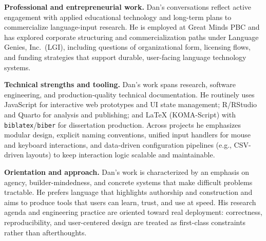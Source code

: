 \UTCOneSingleBlank

\textbf{Professional and entrepreneurial work.}
Dan’s conversations reflect active engagement with applied educational technology and long-term plans to commercialize language-input research. He is employed at Great Minds PBC and has explored corporate structuring and commercialization paths under Language Genies, Inc.\ (LGI), including questions of organizational form, licensing flows, and funding strategies that support durable, user-facing language technology systems.

\UTCOneSingleBlank

\textbf{Technical strengths and tooling.}
Dan’s work spans research, software engineering, and production-quality technical documentation. He routinely uses JavaScript for interactive web prototypes and UI state management; R/RStudio and Quarto for analysis and publishing; and \LaTeX{} (KOMA-Script) with \texttt{biblatex}/\texttt{biber} for dissertation production. Across projects he emphasizes modular design, explicit naming conventions, unified input handlers for mouse and keyboard interactions, and data-driven configuration pipelines (e.g., CSV-driven layouts) to keep interaction logic scalable and maintainable.

\UTCOneSingleBlank

\textbf{Orientation and approach.}
Dan’s work is characterized by an emphasis on agency, builder-mindedness, and concrete systems that make difficult problems tractable. He prefers language that highlights authorship and construction and aims to produce tools that users can learn, trust, and use at speed. His research agenda and engineering practice are oriented toward real deployment: correctness, reproducibility, and user-centered design are treated as first-class constraints rather than afterthoughts.

